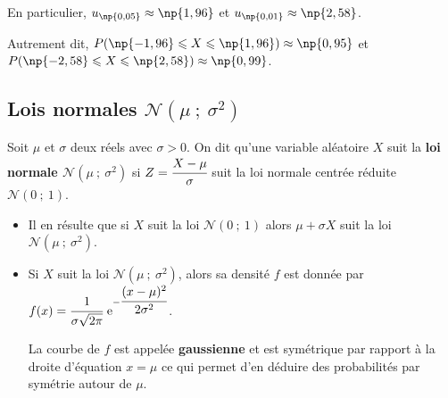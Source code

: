 \documentclass{cornouaille}
\begin{document}
\begin{valeurspart}En particulier, $u_{\np{0,05}} \approx \np{1,96}$ et $u_{\np{0,01}}\approx \np{2,58}$.

Autrement dit, $P(\np{-1,96}\leqslant X\leqslant \np{1,96})\approx \np{0,95}$ et $P(\np{-2,58}\leqslant X\leqslant \np{2,58})\approx \np{0,99}$.
\end{valeurspart}


\subsection{Lois normales $\mathcal{N}(\mu\ ;\ \sigma^2)$}

\begin{definition} Soit $\mu$ et $\sigma$ deux
  réels avec $\sigma>0$. On dit qu'une variable aléatoire $X$ suit la
  \textbf{loi normale $\mathcal{N}(\mu\ ;\ \sigma^2)$} si
  $Z=\cfrac{X-\mu}{\sigma}$ suit la loi normale centrée réduite
  $\mathcal{N}(0\ ;\ 1)$.
\end{definition}

\begin{remarques}
\begin{itemize}
    \item Il en résulte que si $X$ suit la loi $\mathcal{N}(0\ ;\ 1)$ alors $\mu+\sigma X$ suit la loi $\mathcal{N}(\mu\ ;\ \sigma^2)$.
	\item Si $X$ suit la loi $\mathcal{N}(\mu\ ;\ \sigma^2)$,
          alors sa densité $f$ est donnée par
          ${f(x)=\cfrac{1}{\sigma\sqrt{2\pi}}\textrm{ e}^{-\cfrac{(x-\mu)^2}{2\sigma^2}}}$.
	
 La courbe de $f$ est appelée \textbf{gaussienne} et est symétrique par rapport à la droite d'équation $x=\mu$ ce qui permet d'en déduire des probabilités par symétrie autour de $\mu$.
 \begin{center}
\end{center}

\end{itemize}

\end{remarques}
\end{document}
